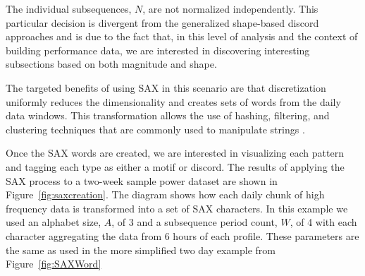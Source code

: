 The individual subsequences, $N$, are not normalized independently. This particular decision is divergent from the generalized shape-based discord approaches and is due to the fact that, in this level of analysis and the context of building performance data,  we are interested in discovering interesting subsections based on both magnitude and shape. 

The targeted benefits of using SAX in this scenario are that discretization uniformly reduces the dimensionality and creates sets of words from the daily data windows. This transformation allows the use of hashing, filtering, and clustering techniques that are commonly used to manipulate strings \cite{lin_experiencing_2007}. 

Once the SAX words are created, we are interested in visualizing each pattern and tagging each type as either a motif or discord. The results of applying the SAX process to a two-week sample power dataset are shown in Figure~\ref{fig:saxcreation}. The diagram shows how each daily chunk of high frequency data is transformed into a set of SAX characters. In this example we used an alphabet size, $A$, of 3 and a subsequence period count, $W$, of 4 with each character aggregating the data from 6 hours of each profile. These parameters are the same as used in the more simplified two day example from Figure~\ref{fig:SAXWord}